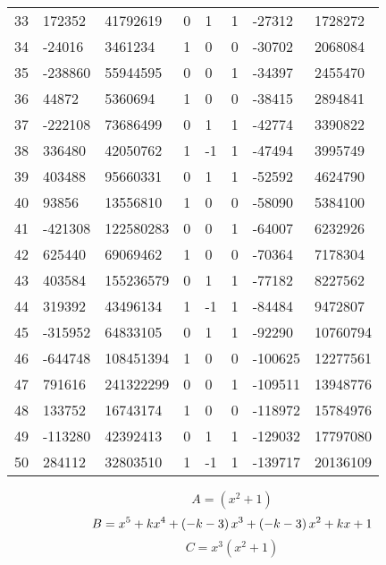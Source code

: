 \documentclass{amsart}
\begin{document}
\begin{longtable}{|l|l|l|lllll|}
33&172352&41792619&0&1&1&-27312&1728272\\
34&-24016&3461234&1&0&0&-30702&2068084\\
35&-238860&55944595&0&0&1&-34397&2455470\\
36&44872&5360694&1&0&0&-38415&2894841\\
37&-222108&73686499&0&1&1&-42774&3390822\\
38&336480&42050762&1&-1&1&-47494&3995749\\
39&403488&95660331&0&1&1&-52592&4624790\\
40&93856&13556810&1&0&0&-58090&5384100\\
41&-421308&122580283&0&0&1&-64007&6232926\\
42&625440&69069462&1&0&0&-70364&7178304\\
43&403584&155236579&0&1&1&-77182&8227562\\
44&319392&43496134&1&-1&1&-84484&9472807\\
45&-315952&64833105&0&1&1&-92290&10760794\\
46&-644748&108451394&1&0&0&-100625&12277561\\
47&791616&241322299&0&0&1&-109511&13948776\\
48&133752&16743174&1&0&0&-118972&15784976\\
49&-113280&42392413&0&1&1&-129032&17797080\\
50&284112&32803510&1&-1&1&-139717&20136109\\
\hline
\end{longtable}
$$A=(x^2
 + 1)$$
$$B=x^5
 + k\*x^4
 + \left(-k
 - 3\right) \*x^3
 + \left(-k
 - 3\right) \*x^2
 + k\*x
 + 1$$
$$C=x^3(x^2
 + 1)$$
\end{document}

